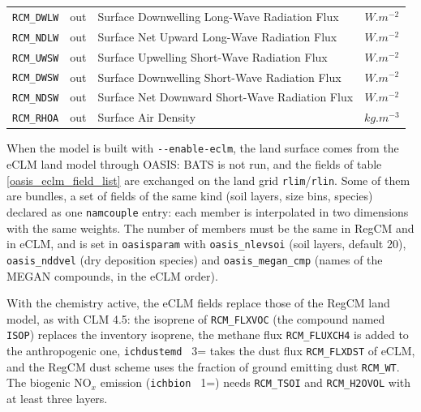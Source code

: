 \begin{table}[ht]
\begin{tabular}{l|c|l|c}
\verb=RCM_DWLW= & out & Surface Downwelling Long-Wave Radiation Flux & $W.m^{-2}$\\
\verb=RCM_NDLW= & out & Surface Net Upward Long-Wave Radiation Flux & $W.m^{-2}$\\
\verb=RCM_UWSW= & out & Surface Upwelling Short-Wave Radiation Flux & $W.m^{-2}$\\
\verb=RCM_DWSW= & out & Surface Downwelling Short-Wave Radiation Flux & $W.m^{-2}$\\
\verb=RCM_NDSW= & out & Surface Net Downward Short-Wave Radiation Flux & $W.m^{-2}$\\
\verb=RCM_RHOA= & out & Surface Air Density & $kg.m^{-3}$\\
\hline
\end{tabular}
\label{oasis_field_list}
\end{table}

When the model is built with \verb=--enable-eclm=, the land surface comes
from the eCLM land model through OASIS: BATS is not run, and the fields of
table \ref{oasis_eclm_field_list} are exchanged on the land grid
\verb=rlim=/\verb=rlin=. Some of them are bundles, a set of fields of the
same kind (soil layers, size bins, species) declared as one \verb=namcouple=
entry: each member is interpolated in two dimensions with the same weights.
The number of members must be the same in RegCM and in eCLM, and is set in
\verb=oasisparam= with \verb=oasis_nlevsoi= (soil layers, default 20),
\verb=oasis_nddvel= (dry deposition species) and \verb=oasis_megan_cmp=
(names of the MEGAN compounds, in the eCLM order).

With the chemistry active, the eCLM fields replace those of the RegCM land
model, as with CLM 4.5: the isoprene of \verb=RCM_FLXVOC= (the compound
named \verb=ISOP=) replaces the inventory isoprene, the methane flux
\verb=RCM_FLUXCH4= is added to the anthropogenic one, \verb=ichdustemd = 3=
takes the dust flux \verb=RCM_FLXDST= of eCLM, and the RegCM dust scheme
uses the fraction of ground emitting dust \verb=RCM_WT=. The biogenic
NO$_x$ emission (\verb=ichbion = 1=) needs \verb=RCM_TSOI= and
\verb=RCM_H2OVOL= with at least three layers.

